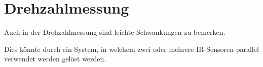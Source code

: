 \section{Drehzahlmessung}
\label{drehzahlmessung}

Auch in der Drehzahlmessung sind leichte Schwankungen zu bemerken.

Dies könnte durch ein System, in welchem zwei oder mehrere IR-Sensoren parallel verwendet werden gelöst werden.
